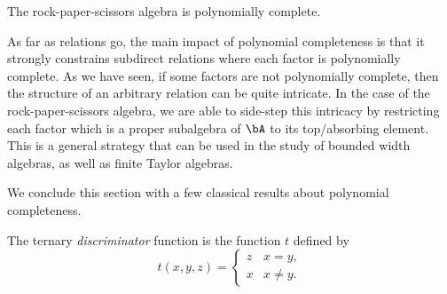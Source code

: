 \begin{cor} The rock-paper-scissors algebra is polynomially complete.
\end{cor}

As far as relations go, the main impact of polynomial completeness is that it strongly constrains subdirect relations where each factor is polynomially complete. As we have seen, if some factors are not polynomially complete, then the structure of an arbitrary relation can be quite intricate. In the case of the rock-paper-scissors algebra, we are able to side-step this intricacy by restricting each factor which is a proper subalgebra of $\bA$ to its top/absorbing element. This is a general strategy that can be used in the study of bounded width algebras, as well as finite Taylor algebras.

We conclude this section with a few classical results about polynomial completeness.

\begin{defn} The ternary \emph{discriminator} function is the function $t$ defined by
\[
t(x,y,z) = \begin{cases} z & x = y,\\ x & x \ne y.\end{cases}
\]
\end{defn}

